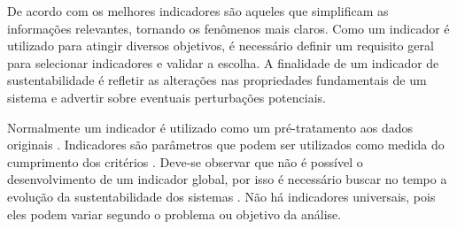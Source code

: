 De acordo com \citet{gallopin1996environmental} os melhores indicadores
são aqueles que simplificam as informações relevantes, tornando os
fenômenos mais claros. Como um indicador é utilizado para atingir
diversos objetivos, é necessário definir um requisito geral para selecionar
indicadores e validar a escolha. A finalidade de um indicador de sustentabilidade
é refletir as alterações nas propriedades fundamentais de um sistema
\citep{CaminoAndMuller1993} e advertir sobre eventuais perturbações
potenciais\citep{ferraz2003}.

Normalmente um indicador é utilizado como um pré-tratamento aos dados
originais \citep{SicheAgostinho2007}. Indicadores são parâmetros
que podem ser utilizados como medida do cumprimento dos critérios
\citep{moret2006criterios}. Deve-se observar que não é possível o
desenvolvimento de um indicador global, por isso é necessário buscar
no tempo a evolução da sustentabilidade dos sistemas \citep{CaminoAndMuller1993}.
Não há indicadores universais, pois eles podem variar segundo o problema
ou objetivo da análise.

